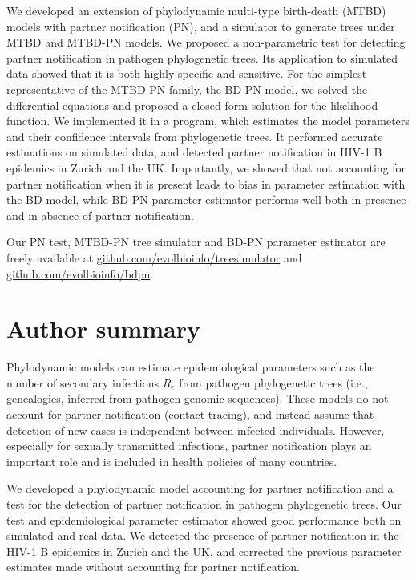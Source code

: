 \documentclass[10pt,letterpaper]{article}
\begin{document}
We developed an extension of phylodynamic multi-type birth-death (MTBD) models with partner notification (PN), and a simulator to generate trees under MTBD and MTBD-PN models. We proposed a non-parametric test for detecting partner notification in pathogen phylogenetic trees. Its application to simulated data showed that it is both highly specific and sensitive. For the simplest representative of the MTBD-PN family, the BD-PN model, we solved the differential equations and proposed a closed form solution for the likelihood function. We implemented it in a program, which estimates the model parameters and their confidence intervals from phylogenetic trees. It performed accurate estimations on simulated data, and detected partner notification in HIV-1 B epidemics in Zurich and the UK. Importantly, we showed that not accounting for partner notification when it is present leads to bias in parameter estimation with the BD model, while BD-PN parameter estimator performs well both in presence and in absence of partner notification.

Our PN test, MTBD-PN tree simulator and BD-PN parameter estimator are freely available at \href{https://github.com/evolbioinfo/treesimulator}{github.com/evolbioinfo/treesimulator} and \href{https://github.com/evolbioinfo/bdpn}{github.com/evolbioinfo/bdpn}.


\section*{Author summary}
Phylodynamic models can estimate epidemiological parameters such as the number of secondary infections $R_e$ from pathogen phylogenetic trees (i.e., genealogies, inferred from pathogen genomic sequences). These models do not account for partner notification (contact tracing), and instead assume that detection of new cases is independent between infected individuals. However, especially for sexually transmitted infections, partner notification plays an important role and is included in health policies of many countries. 

We developed a phylodynamic model accounting for partner notification and a test for the detection of partner notification in pathogen phylogenetic trees. Our test and epidemiological parameter estimator showed good performance both on simulated and real data. We detected the presence of partner notification in the HIV-1 B epidemics in Zurich and the UK, and corrected the previous parameter estimates made without accounting for partner notification. %
\end{document}
